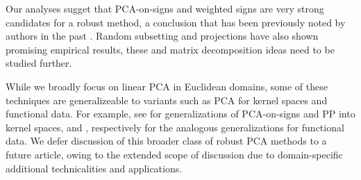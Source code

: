 \documentclass[ss]{imsart}
\newcommand{\BR}{{\mathbb{R}}}
\newcommand{\cH}{\mathcal{H}}
\theoremstyle{Example}
\begin{document}
Our analyses sugget that PCA-on-signs and weighted signs are very strong candidates for a robust method, a conclusion that has been previously noted by authors in the past \cite{ref:Test991_RPCA_FPCA, ref:Technometrics05264_Maronna_RCPA, ref:EJS111123_Tropp_RPCA}. Random subsetting and projections have also shown promising empirical results, these and matrix decomposition ideas need to be studied further.

{\color{red}
While we broadly focus on linear PCA in Euclidean domains, some of these techniques are generalizeable to variants such as PCA for kernel spaces and functional data. For example, see \cite{DeBruyneVerdonck10,DebruyneEtal10} for generalizations of PCA-on-signs and PP into kernel spaces, and \cite{Gervini08}, \cite{BaliEtal11} respectively for the analogous generalizations for functional data. We defer discussion of this broader class of robust PCA methods to a future article, owing to the extended scope of discussion due to domain-specific additional technicalities and applications.
}


\end{document}
